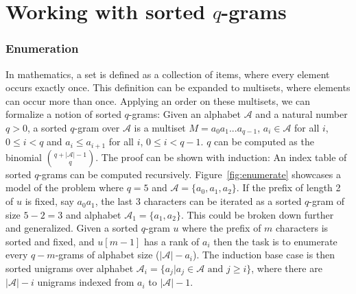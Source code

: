 \documentclass[twoside,a4paper,bsc]{master}
\newcommand{\Qgram}[1]{\(#1\)-gram}
\newcommand{\Alpha}[0]{\mathcal{A}}
\begin{document}
\section{Working with sorted \Qgram{q}s}
\subsubsection{Enumeration}
In mathematics, a set is defined as a collection of items, where every
element occurs exactly once. This definition can be expanded to multisets,
where elements can occur more than once. Applying an order on these
multisets, we can formalize a notion of sorted \Qgram{q}s:
Given an alphabet \(\Alpha\) and a natural number \(q > 0\), a sorted
\Qgram{q} over \(\Alpha\) is a multiset \(M=a_0a_1...a_{q-1}\),
\(a_i\in\Alpha\) for all \(i\), \(0\leq i<q\) and
\(a_i\leq a_{i+1}\) for all \(i\), \(0\leq i < q-1\).
\(q\) can be computed as the binomial \(\binom{q+|\Alpha|-1}{q}\). The
proof can be shown with induction:
An index table of sorted \Qgram{q}s can be computed recursively.
Figure~\ref{fig:enumerate} showcases a model of the problem where \(q=5\)
and \(\Alpha=\{a_0,a_1,a_2\}\). If the prefix of length 2 of \(u\) is
fixed, say \(a_0a_1\), the last 3 characters can be iterated as a sorted
\Qgram{q} of size \(5-2=3\) and alphabet \(\Alpha_1 = \{a_1,a_2\}\). This
could be broken down further and generalized.
Given a sorted \Qgram{q} \(u\) where the prefix of \(m\) characters is
sorted and fixed, and \(u[m-1]\) has a rank of \(a_i\) then the task is to
enumerate every \Qgram{q-m}s of alphabet size (\(|\Alpha|-a_i\)).
The induction base case is then sorted unigrams over alphabet \(\Alpha_i =
\{a_j| a_j\in\Alpha \text{ and } j\geq i\}\), where there are \(|\Alpha|-i\)
unigrams indexed from \(a_i\) to \(|\Alpha|-1\).
\end{document}
